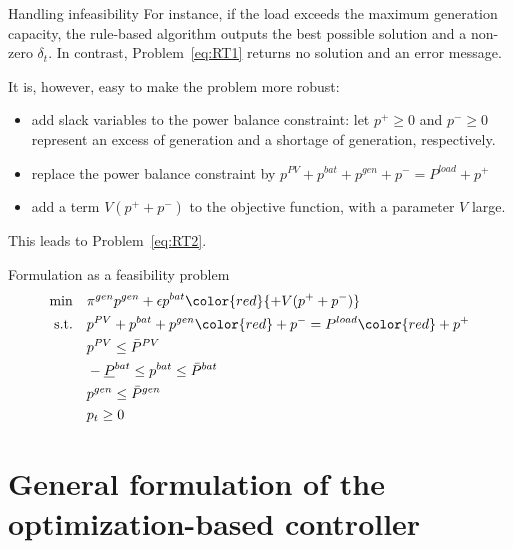 \begin{frame}{Handling infeasibility}
For instance, if the load exceeds the maximum generation capacity, the rule-based algorithm outputs the best possible solution and a non-zero $\delta_t$. 
In contrast, Problem~\eqref{eq:RT1} returns no solution and an error message. 

It is, however, easy to make the problem more robust: 
\begin{itemize}
    \item add slack variables to the power balance constraint: let $p^+ \geq 0$ and $p^- \geq 0$ represent an excess of generation and a shortage of generation, respectively. 
    \item replace the power balance constraint by $p^{PV}+p^{bat}+p^{gen} + p^-= P^{load} + p^+$
    \item add a term $V (p^+ + p^-)$ to the objective function, with a parameter $V$ large.
\end{itemize} 

This leads to Problem~\eqref{eq:RT2}.
\end{frame}

\begin{frame}{Formulation as a feasibility problem}
\begin{subequations}
	\label{eq:RT2}
\begin{align}
\min        \quad  & \pi^{gen} p^{gen}  + \epsilon p^{bat} \color{red}{+ V (p^+ + p^-)} \label{eq:obj_2}\\
\text{s.t.} \quad  & p^{PV}+p^{bat} +p^{gen} {\color{red}+ p^-}  = P^{load} {\color{red} + p^+}  \label{eq:bal_2} \\
                   & p^{PV} \leq \bar{P}^{PV}  \label{eq:PV_2}\\
                   & -\underline{P}^{bat} \leq p^{bat} \leq \bar{P}^{bat}  \label{eq:bat_2}\\
                   & p^{gen} \leq \bar{P}^{gen}  \label{eq:gen_2}\\
                   & p_t \geq 0  \label{eq:nonneg_2}
\end{align}
\end{subequations}


\end{frame}

\section[General formulation of the optimization-based controller]{General formulation of the\\ optimization-based controller}

